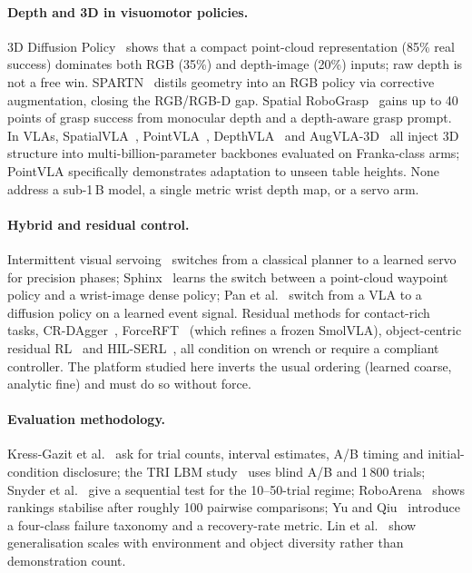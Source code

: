 \documentclass[11pt,a4paper]{article}
\theoremstyle{definition}
\begin{document}
\paragraph{Depth and 3D in visuomotor policies.}
3D Diffusion Policy~\citep{ze2024dp3} shows that a compact point-cloud representation (85\% real success) dominates both RGB (35\%) and depth-image (20\%) inputs; raw depth is not a free win. SPARTN~\citep{zhou2023spartn} distils geometry into an RGB policy via corrective augmentation, closing the RGB/RGB-D gap. Spatial RoboGrasp~\citep{huang2025spatialrobograsp} gains up to 40 points of grasp success from monocular depth and a depth-aware grasp prompt. In VLAs, SpatialVLA~\citep{qu2025spatialvla}, PointVLA~\citep{li2025pointvla}, DepthVLA~\citep{yuan2025depthvla} and AugVLA-3D~\citep{rao2026augvla} all inject 3D structure into multi-billion-parameter backbones evaluated on Franka-class arms; PointVLA specifically demonstrates adaptation to unseen table heights. None address a sub-1\,B model, a single metric wrist depth map, or a servo arm.

\paragraph{Hybrid and residual control.}
Intermittent visual servoing~\citep{paradis2021ivs} switches from a classical planner to a learned servo for precision phases; Sphinx~\citep{sundaresan2024sphinx} learns the switch between a point-cloud waypoint policy and a wrist-image dense policy; Pan et al.~\citep{pan2024switching} switch from a VLA to a diffusion policy on a learned event signal. Residual methods for contact-rich tasks, CR-DAgger~\citep{xu2025crdagger}, ForceRFT~\citep{forcerft2026} (which refines a frozen SmolVLA), object-centric residual RL~\citep{kim2026objectcentric} and HIL-SERL~\citep{luo2024hilserl}, all condition on wrench or require a compliant controller. The platform studied here inverts the usual ordering (learned coarse, analytic fine) and must do so without force.

\paragraph{Evaluation methodology.}
Kress-Gazit et al.~\citep{kressgazit2024empirical} ask for trial counts, interval estimates, A/B timing and initial-condition disclosure; the TRI LBM study~\citep{tri2025lbm} uses blind A/B and 1\,800 trials; Snyder et al.~\citep{snyder2025comparison} give a sequential test for the 10--50-trial regime; RoboArena~\citep{atreya2025roboarena} shows rankings stabilise after roughly 100 pairwise comparisons; Yu and Qiu~\citep{yu2026so101} introduce a four-class failure taxonomy and a recovery-rate metric. Lin et al.~\citep{lin2025scaling} show generalisation scales with environment and object diversity rather than demonstration count.
\end{document}
